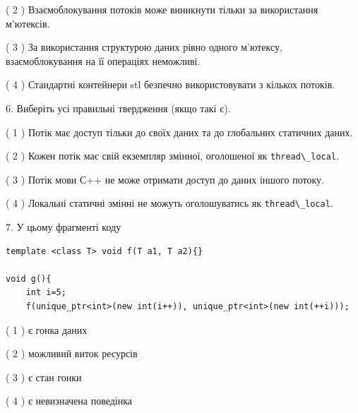 \documentclass[12pt, ukrainian]{article}
\def\code#1{\Verb!#1!}
\begin{document}
\begin {large}
{( 2 ) Взаємоблокування потоків може виникнути тільки за використання м’ютексів.%

( 3 ) За використання структурою даних рівно одного м’ютексу, взаємоблокування на її операціях неможливі.%

( 4 ) Стандартні контейнери stl безпечно використовувати з кількох потоків.%
\newpage



\vspace{5mm}
6. Виберіть усі правильні твердження (якщо такі є).\par
\vspace{2mm}

( 1 ) Потік має доступ тільки до своїх даних та до глобальних статичних даних.%

( 2 ) Кожен потік має свій екземпляр змінної, оголошеної як \code{thread\_local}.%

( 3 ) Потік мови С++ не може отримати доступ до даних іншого потоку.%

( 4 ) Локальні статичні змінні не можуть оголошуватись як \code{thread\_local}.%


\vspace{5mm}
7. У цьому фрагменті коду
\begin{verbatim}
template <class T> void f(T a1, T a2){}

void g(){
    int i=5;
    f(unique_ptr<int>(new int(i++)), unique_ptr<int>(new int(++i)));
\end{verbatim}

( 1 ) є гонка даних%

( 2 ) можливий виток ресурсів%

( 3 ) є стан гонки%

( 4 ) є невизначена поведінка%
}
\end {large}
\end{document}
